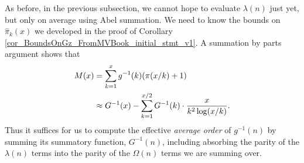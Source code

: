 \documentclass[11pt,reqno,a4letter]{article}
\numberwithin{figure}{section}
\numberwithin{table}{section}
\theoremstyle{plain}
\numberwithin{theorem}{section}
\theoremstyle{definition}
\begin{document}
As before, in the previous subsection, we cannot hope to evaluate $\lambda(n)$ just yet, but only on 
average using Abel summation. We need to know the bounds on $\widehat{\pi}_k(x)$ we developed in the 
proof of Corollary \ref{cor_BoundsOnGz_FromMVBook_initial_stmt_v1}. 
A summation by parts argument shows that 
\begin{align} 
\notag
M(x) & = \sum_{k=1}^{x} g^{-1}(k) (\pi(x/k)+1) \\ 
\label{eqn_pf_tag_v2-restated_v2} 
     & \approx G^{-1}(x) - \sum_{k=1}^{x/2} G^{-1}(k) \cdot \frac{x}{k^2 \log(x/k)}. 
\end{align} 
Thus it suffices for us to compute the effective \emph{average order} of $g^{-1}(n)$ 
by summing its summatory function, $G^{-1}(n)$, including absorbing the parity of the 
$\lambda(n)$ terms into the parity of the $\Omega(n)$ terms we are summing over. 
\end{document}
